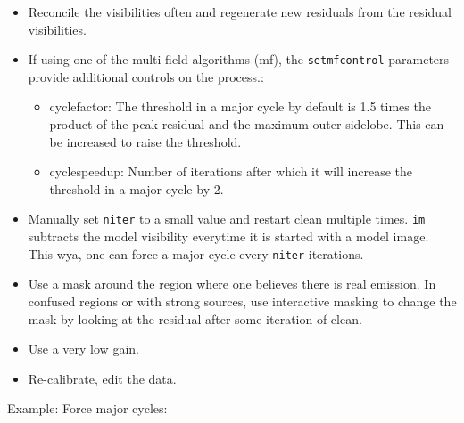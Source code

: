 \begin{itemize}
  \item Reconcile the visibilities often and regenerate new residuals
        from the residual visibilities. 
  \item If using one of the multi-field algorithms (mf), the
        {\tt setmfcontrol} parameters provide additional controls on the
        process.:
     \begin{itemize}
     \item cyclefactor: The threshold in a major cycle by default is
           1.5 times the product of the peak residual and the maximum outer
           sidelobe. This can be increased to raise the threshold. 
     \item cyclespeedup: Number of iterations after which it will
           increase the threshold in a major cycle by 2. 
      \end{itemize}
 \item Manually set {\tt niter} to a small value and restart clean
       multiple times. {\tt im} subtracts the model visibility everytime it
       is started with a model image. This wya, one can force a major
       cycle every {\tt niter} iterations. 
 \item Use a mask around the region where one believes there is real
       emission. In confused regions or with strong sources, use
       interactive masking to change the 
       mask by looking at the residual after some iteration of clean. 
 \item Use a very low gain.
 \item Re-calibrate, edit the data.
\end{itemize}

Example: Force major cycles:

